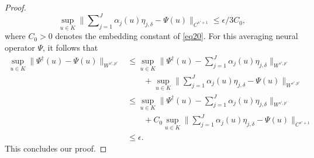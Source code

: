 \documentclass[reqno]{amsart}
\theoremstyle{plain}
\theoremstyle{definition}
\begin{document}
\begin{proof}
$$ \sup_{u\in K}\|\sum\nolimits_{j=1}^{J}\alpha_j(u)\eta_{j,\delta} - \Psi(u)\|_{C^{s'+1}} \leq \epsilon/3C_0,$$
where $C_0 > 0$ denotes the embedding constant of \ref{eq20}. For this averaging neural operator $\Psi$, it follows that 
$$ 
\begin{aligned}
    \sup_{u\in K}\|\Psi^\dag(u) - \Psi(u)\|_{W^{s',p'}} &\leq \sup_{u\in K}\|\Psi^\dag (u) - \sum\nolimits_{j=1}^{J} \alpha_j(u) \eta_{j,\delta}\|_{W^{s',p'}}\\
    &\qquad +\sup_{u\in K}\|\sum\nolimits_{j=1}^{J}\alpha_j(u)\eta_{j,\delta}-\Psi(u)\|_{W^{s',p'}}\\
    &\leq \sup_{u\in K}\|\Psi^\dag(u) - \sum\nolimits_{j=1}^{J}\alpha_j(u)\eta_{j,\delta}\|_{W^{s',p'}} \\
    & \qquad + C_0\sup_{u\in K}\|\sum\nolimits_{j=1}^{J}\alpha_j(u)\eta_{j,\delta} -\Psi(u) \|_{C^{s'+1}}\\
    &\leq \epsilon.
\end{aligned}
$$
This concludes our proof.
\end{proof}

\appendix
\end{document}
